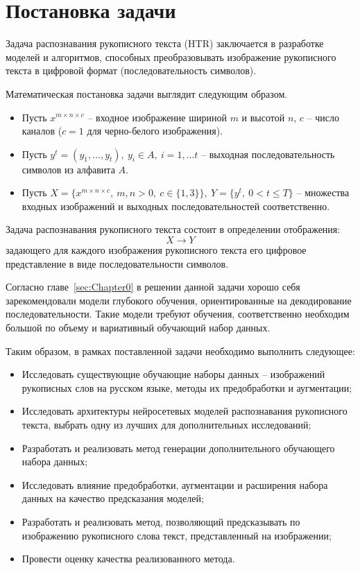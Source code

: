 \section{Постановка задачи}
\label{sec:Chapter1} 

Задача распознавания рукописного текста (HTR) заключается в разработке моделей и алгоритмов,
способных преобразовывать изображение рукописного текста в цифровой формат (последовательность символов).

Математическая постановка задачи выглядит следующим образом.

\begin{itemize}
    \item[] Пусть $x^{m \times n \times c}$ -- входное изображение шириной $m$ и высотой $n$, $c$ -- число каналов ($c=1$ для черно-белого изображения).
    \item[] Пусть $y^t=(y_1,\dots,y_t),~y_i \in A,~i=1,\dots t$ -- выходная последовательность символов из алфавита $A$.
    \item[] Пусть $X=\{x^{m \times n \times c},~m,n>0,~c\in\{1,3\}\},~Y=\{y^t,~0<t\leqslant T\}$ -- множества входных изображений и выходных последовательностей соответственно.
\end{itemize}

Задача распознавания рукописного текста состоит в определении отображения:
\[ X \rightarrow Y \]
задающего для каждого изображения рукописного текста его цифровое представление в виде последовательности символов.

Согласно главе~\ref{sec:Chapter0} в решении данной задачи хорошо себя зарекомендовали модели глубокого обучения,
ориентированные на декодирование последовательности.
Такие модели требуют обучения, соответственно необходим большой по объему и вариативный обучающий набор данных.

Таким образом, в рамках поставленной задачи необходимо выполнить следующее:
\begin{itemize}
    \item Исследовать существующие обучающие наборы данных -- изображений рукописных слов на русском языке, методы их предобработки и аугментации;
    \item Исследовать архитектуры нейросетевых моделей распознавания рукописного текста, выбрать одну из лучших для дополнительных исследований;
    \item Разработать и реализовать метод генерации дополнительного обучающего набора данных;
    \item Исследовать влияние предобработки, аугментации и расширения набора данных на качество предсказания моделей;
    \item Разработать и реализовать метод, позволяющий предсказывать по изображению рукописного слова текст, представленный на изображении;
    \item Провести оценку качества реализованного метода.
\end{itemize}
